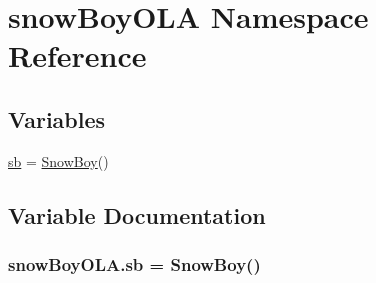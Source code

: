 \hypertarget{namespacesnowBoyOLA}{}\section{snow\+Boy\+O\+LA Namespace Reference}
\label{namespacesnowBoyOLA}
\subsection*{Variables}
\begin{DoxyCompactItemize}
\item 
\hyperlink{namespacesnowBoyOLA_ab93403c888b7d02c5fbea3aa02616143}{sb} = \hyperlink{classvoiceOLA_1_1SnowBoy}{Snow\+Boy}()
\end{DoxyCompactItemize}


\subsection{Variable Documentation}
\subsubsection[{\texorpdfstring{sb}{sb}}]{\setlength{\rightskip}{0pt plus 5cm}snow\+Boy\+O\+L\+A.\+sb = {\bf Snow\+Boy}()}\hypertarget{namespacesnowBoyOLA_ab93403c888b7d02c5fbea3aa02616143}{}\label{namespacesnowBoyOLA_ab93403c888b7d02c5fbea3aa02616143}
